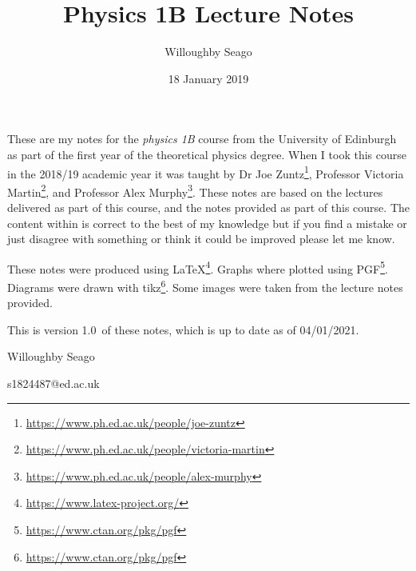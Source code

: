 \documentclass{article}
\title{Physics 1B Lecture Notes}
\author{Willoughby Seago}
\date{18 January 2019}
\newcommand{\notesVersion}{1.0}
\newcommand{\notesDate}{04/01/2021}
\begin{document}
\maketitle
These are my notes for the \textit{physics 1B} course from the University of Edinburgh as part of the first year of the theoretical physics degree.
When I took this course in the 2018/19 academic year it was taught by Dr Joe Zuntz\footnote{\url{https://www.ph.ed.ac.uk/people/joe-zuntz}}, Professor Victoria Martin\footnote{\url{https://www.ph.ed.ac.uk/people/victoria-martin}}, and Professor Alex Murphy\footnote{\url{https://www.ph.ed.ac.uk/people/alex-murphy}}.
These notes are based on the lectures delivered as part of this course, and the notes provided as part of this course.
The content within is correct to the best of my knowledge but if you find a mistake or just disagree with something or think it could be improved please let me know.

These notes were produced using \LaTeX\footnote{\url{https://www.latex-project.org/}}.
Graphs where plotted using PGF\footnote{\url{https://www.ctan.org/pkg/pgf}}.
Diagrams were drawn with tikz\footnote{\url{https://www.ctan.org/pkg/pgf}}.
Some images were taken from the lecture notes provided.

This is version \notesVersion~of these notes, which is up to date as of \notesDate.
\begin{flushright}
    Willoughby Seago
    
    s1824487@ed.ac.uk
\end{flushright}
\clearpage
\tableofcontents
\newpage



\end{document}

